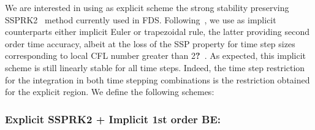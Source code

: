 \documentclass[12pt]{article}
\begin{document}
We are interested in using as explicit scheme the strong stability preserving SSPRK2~\cite{Gottlieb:2001} method currently used in FDS. 
Following~\cite{May:2014}, we use as implicit counterparts either implicit Euler or trapezoidal rule, the latter providing second order time accuracy, albeit at the loss of the SSP property for time step sizes corresponding to local CFL number greater than 2\textbf{?}~\cite{Ketcheson:2009,Gottlieb:2009}. As expected, this implicit scheme is still linearly stable for all time steps. Indeed, the time step restriction for the integration in both time stepping combinations is the restriction obtained for the explicit region.
We define the following schemes:

\subsubsection*{Explicit SSPRK2 + Implicit 1st order BE:} 
\end{document}
